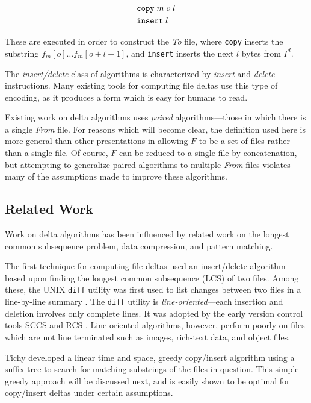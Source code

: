 \documentclass{llncs}
\begin{document}
\begin{align}
&\texttt{copy} \; m \; o \; l \\
&\texttt{insert} \; l
\end{align}

\noindent These are executed in order to construct the \emph{To} file,
where \texttt{copy} inserts the substring $f_m[o] \ldots f_m[o+l-1]$,
and \texttt{insert} inserts the next $l$ bytes from $I^d$.

The \emph{insert/delete} class of algorithms is characterized by
\emph{insert} and \emph{delete} instructions.  Many existing tools for
computing file deltas use this type of encoding, as it produces a form
which is easy for humans to read.

Existing work on delta algorithms uses \emph{paired}
algorithms---those in which there is a single \emph{From} file.  For
reasons which will become clear, the definition used here is more
general than other presentations in allowing $F$ to be a set of files
rather than a single file.  Of course, $F$ can be reduced to a single
file by concatenation, but attempting to generalize paired algorithms
to multiple \emph{From} files violates many of the assumptions made to
improve these algorithms.

\subsection{Related Work}

Work on delta algorithms has been influenced by related work on the
longest common subsequence problem, data compression, and pattern
matching.

The first technique for computing file deltas used an insert/delete
algorithm based upon finding the longest common subsequence (LCS) of
two files.  Among these, the UNIX \texttt{diff} utility was first used
to list changes between two files in a line-by-line summary
\cite{Miller:1985:FCP}.  The \texttt{diff} utility is
\emph{line-oriented}---each insertion and deletion involves only
complete lines.  It was adopted by the early version control tools
SCCS \cite{Rochkind:ieee:tose:1975} and RCS \cite{Tichy:1985:RSV}.
Line-oriented algorithms, however, perform poorly on files which are
not line terminated such as images, rich-text data, and object files.

Tichy developed a linear time and space, greedy copy/insert algorithm
\cite{Tichy84} using a suffix tree to search for matching substrings
of the files in question.  This simple greedy approach will be
discussed next, and is easily shown to be optimal for copy/insert
deltas under certain assumptions.
\end{document}
